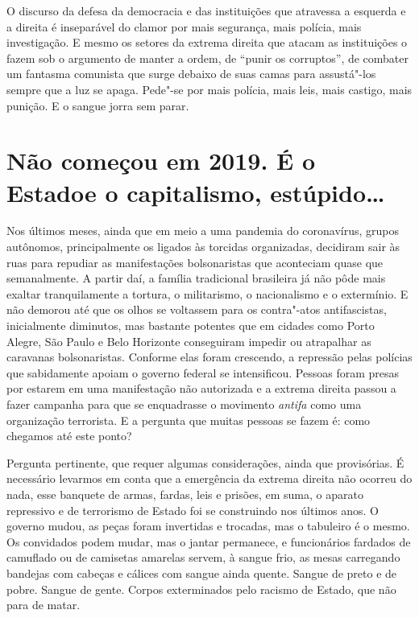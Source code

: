 O discurso da defesa da democracia e das instituições que atravessa a
esquerda e a direita é inseparável do clamor por mais segurança, mais
polícia, mais investigação. E mesmo os setores da extrema direita que
atacam as instituições o fazem sob o argumento de manter a ordem, de
``punir os corruptos'', de combater um fantasma comunista que surge
debaixo de suas camas para assustá"-los sempre que a luz se apaga.
Pede"-se por mais polícia, mais leis, mais castigo, mais punição. E o
sangue jorra sem parar.

\section{Não começou em 2019. É o Estado\break e o capitalismo, estúpido\ldots{}}

Nos últimos meses, ainda que em meio a uma pandemia do coronavírus,
grupos autônomos, principalmente os ligados às torcidas organizadas,
decidiram sair às ruas para repudiar as manifestações bolsonaristas que
aconteciam quase que semanalmente. A partir daí, a família tradicional
brasileira já não pôde mais exaltar tranquilamente a tortura, o
militarismo, o nacionalismo e o extermínio. E não demorou até que os
olhos se voltassem para os contra"-atos antifascistas, inicialmente
diminutos, mas bastante potentes que em cidades como Porto Alegre, São
Paulo e Belo Horizonte conseguiram impedir ou atrapalhar as caravanas
bolsonaristas. Conforme elas foram crescendo, a repressão pelas polícias
que sabidamente apoiam o governo federal se intensificou. Pessoas foram
presas por estarem em uma manifestação não autorizada e a
extrema direita passou a fazer campanha para que se enquadrasse o
movimento \emph{antifa} como uma organização terrorista. E a pergunta
que muitas pessoas se fazem é: como chegamos até este ponto?

Pergunta pertinente, que requer algumas considerações, ainda que
provisórias. É necessário levarmos em conta que a emergência da
extrema direita não ocorreu do nada, esse banquete de armas, fardas,
leis e prisões, em suma, o aparato repressivo e de terrorismo de Estado
foi se construindo nos últimos anos. O governo mudou, as peças foram
invertidas e trocadas, mas o tabuleiro é o mesmo. Os convidados podem
mudar, mas o jantar permanece, e funcionários fardados de camuflado ou
de camisetas amarelas servem, à sangue frio, as mesas carregando
bandejas com cabeças e cálices com sangue ainda quente. Sangue de preto
e de pobre. Sangue de gente. Corpos exterminados pelo racismo de Estado,
que não para de matar.

